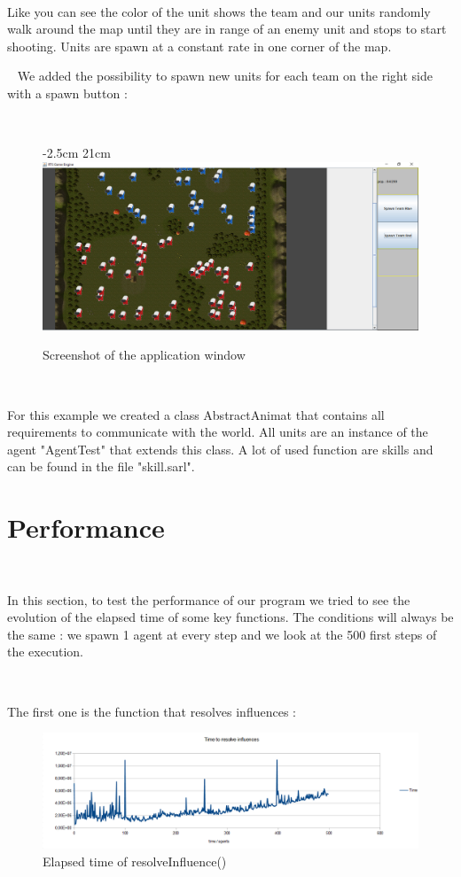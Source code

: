 \documentclass[a4paper,10pt]{book}
\begin{document}
~

Like you can see the color of the unit shows the team and our units randomly walk around the map until they are in range of an enemy unit and stops to start shooting. Units are spawn at a constant rate in one corner of the map.

~
\newpage
We added the possibility to spawn new units for each team on the right side with a spawn button :

~

\begin{figure}[h]
  -2.5cm 21cm
 \centering
 \includegraphics[scale=0.5]{GUI3}
 \caption{Screenshot of the application window}
\end{figure}

~

For this example we created a class AbstractAnimat that contains all requirements to communicate with the world. All units are an instance of the agent "AgentTest" that extends this class. A lot of used function are skills and can be found in the file "skill.sarl".

\newpage

\chapter {Performance}

~

In this section, to test the performance of our program we tried to see the evolution of the elapsed time of some key functions. The conditions will always be the same : we spawn 1 agent at every step and we look at the 500 first steps of the execution.

~

The first one is the function that resolves influences :

\begin{figure}[ht]
 \centering
 \includegraphics[scale=0.5]{resolveInfluence}
 \caption{Elapsed time of resolveInfluence()}
\end{figure}
\end{document}
